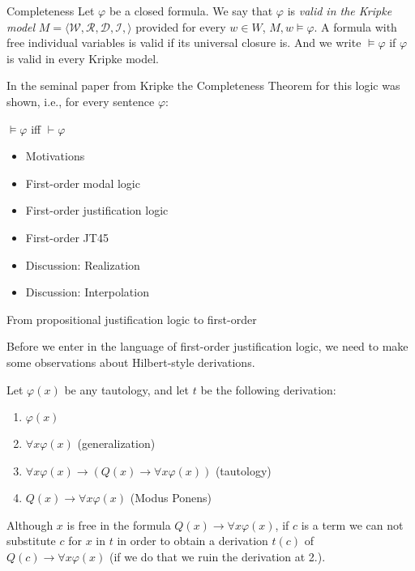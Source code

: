 \documentclass{beamer}
\theoremstyle{definition}
\newcommand{\D}{\mathcal{D}}
\newcommand{\W}{\mathcal{W}}
\newcommand{\R}{\mathcal{R}}
\newcommand{\I}{\mathcal{I}}
\newcommand{\Kmodel}{\bl\W,\R,\D,\I,\br}
\newcommand{\impli}{\rightarrow}
\newcommand{\todo}{\forall}
\newcommand{\teo}{\vdash}
\newcommand{\bl}{\langle}
\newcommand{\br}{\rangle}
\begin{document}
\begin{frame}{Completeness} 
\qquad Let $\varphi$ be a closed formula. We say that $\varphi$ is \textit{valid in the Kripke model} $M = \Kmodel$ provided for every $w \in W$, $M,w \models \varphi$. A formula with free individual variables is valid if its universal closure is. And we write $\models \varphi$ if $\varphi$ is valid in every Kripke model.

\qquad In the seminal paper from Kripke \cite{Kripke59} the Completeness Theorem for this logic was shown, i.e., for every sentence $\varphi$:

\begin{center}
$\models \varphi$ iff $\teo \varphi$
\end{center}

\end{frame}


\begin{frame}
	\begin{itemize}
		\item[] Motivations
		\vspace{5mm}	
		\item[] First-order modal logic
		\vspace{5mm}
		\item[] {\color{blue}First-order justification logic}
		\vspace{5mm}
		\item[] First-order JT45
		\vspace{5mm}
		\item[] Discussion: Realization
		\vspace{5mm}
		\item[] Discussion: Interpolation
	\end{itemize} 
\end{frame}


	
\begin{frame}{From propositional justification logic to first-order}

\qquad Before we enter in the language of first-order justification logic, we need to make some observations about Hilbert-style derivations.

\qquad Let $\varphi(x)$ be any tautology, and let $t$ be the following derivation:

\begin{enumerate}[1.]
\item $\varphi(x)$ 
\item $\todo x \varphi(x)$                 (generalization)
\item $\todo x\varphi(x) \impli (Q(x) \impli \todo x\varphi(x))$ (tautology)
\item $Q(x) \impli \todo x\varphi(x)$ (Modus Ponens)
\end{enumerate}

\qquad Although $x$ is free in the formula $Q(x) \impli \todo x\varphi(x)$, if $c$ is a term we can not substitute $c$ for $x$ in $t$ in order to obtain a derivation $t(c)$ of $Q(c) \impli \todo x\varphi(x)$ (if we do that we ruin the derivation at 2.).
\end{frame}
\end{document}
